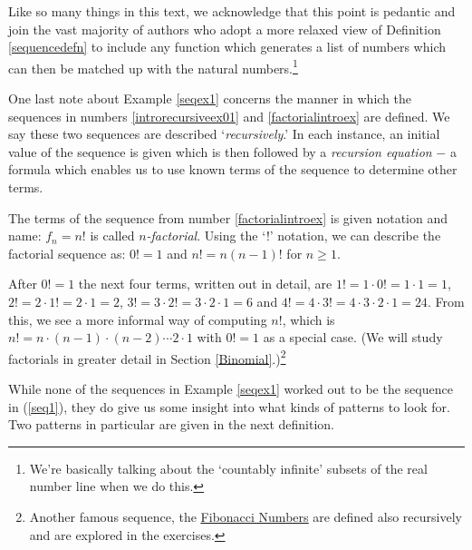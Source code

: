 \documentclass{ximera}
\begin{document}
Like so many things in this text, we acknowledge that this point is pedantic and join the vast majority of authors who adopt a more relaxed view of Definition \ref{sequencedefn} to include any function which generates a list of numbers which can then be matched up with the natural numbers.\footnote{We're basically talking about the `countably infinite' subsets of the real number line when we do this.}   


 One last note about Example \ref{seqex1} concerns the manner in which the sequences in numbers  \ref {introrecursiveex01} and \ref{factorialintroex} are defined.  We say these two sequences are  described  `\textit{recursively}.'  In each instance, an initial value of the sequence is given which is then followed by a  \textit{recursion equation} $-$ a formula which enables us to use known terms of the sequence to determine other terms.  
 
 The terms of the sequence from number  \ref{factorialintroex} is given notation and name:  $f_{n}=n!$ is called  \textit{$n$-factorial}.  Using the `!' notation, we can describe the factorial sequence as: $0! = 1$ and $n! = n(n-1)!$ for $n \geq 1$. 
 
 After $0! = 1$ the next four terms, written out in detail, are $1! = 1 \cdot 0! = 1 \cdot 1 = 1$, $2! = 2 \cdot 1! = 2 \cdot 1 = 2$, $3! = 3 \cdot 2! = 3 \cdot 2 \cdot 1 = 6$ and  $4! = 4 \cdot 3! = 4 \cdot 3 \cdot 2 \cdot 1 = 24$.  From this, we see a more informal way of computing  $n!$, which is $n! = n\cdot(n -1)\cdot(n -2) \cdots 2 \cdot 1$ with $0! = 1$ as a special case.  (We will study factorials in greater detail in Section \ref{Binomial}.)\footnote{Another  famous sequence, the \href{http://en.wikipedia.org/wiki/Fibonacci_number}{\underline{Fibonacci Numbers}} are defined also recursively and are explored in the exercises.}  
 
 While none of the sequences in Example \ref{seqex1} worked out to be the sequence in (\ref{seq1}), they do give us some insight into what kinds of patterns to look for.  Two patterns in particular are given in the next definition.

\smallskip
\end{document}
